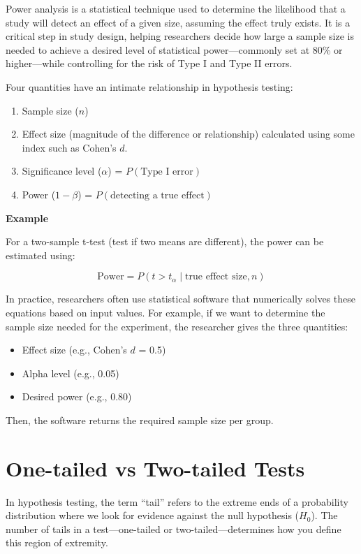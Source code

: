 \documentclass[
]{book}
\providecommand{\tightlist}{%
  \setlength{\itemsep}{0pt}\setlength{\parskip}{0pt}}
\begin{document}
Power analysis is a statistical technique used to determine the likelihood that a study will detect an effect of a given size, assuming the effect truly exists. It is a critical step in study design, helping researchers decide how large a sample size is needed to achieve a desired level of statistical power---commonly set at 80\% or higher---while controlling for the risk of Type I and Type II errors.

Four quantities have an intimate relationship in hypothesis testing:

\begin{enumerate}
\def\labelenumi{\arabic{enumi}.}
\tightlist
\item
  Sample size (\(n\))
\item
  Effect size (magnitude of the difference or relationship) calculated using some index such as Cohen's \(d\).
\item
  Significance level (\(\alpha\)) = \(P(\text{Type I error})\)
\item
  Power (\(1-\beta\)) = \(P(\text{detecting a true effect})\)
\end{enumerate}

\textbf{Example}

For a two-sample t-test (test if two means are different), the power can be estimated using:

\[\text{Power} = P(t > t_\alpha \mid \text{true effect size}, n)\]

In practice, researchers often use statistical software that numerically solves these equations based on input values. For example, if we want to determine the sample size needed for the experiment, the researcher gives the three quantities:

\begin{itemize}
\tightlist
\item
  Effect size (e.g., Cohen's \(d\) = 0.5)
\item
  Alpha level (e.g., 0.05)
\item
  Desired power (e.g., 0.80)
\end{itemize}

Then, the software returns the required sample size per group.

\section{One-tailed vs Two-tailed Tests}\label{one-tailed-vs-two-tailed-tests}

In hypothesis testing, the term ``tail'' refers to the extreme ends of a probability distribution where we look for evidence against the null hypothesis (\(H_0\)). The number of tails in a test---one-tailed or two-tailed---determines how you define this region of extremity.
\end{document}

